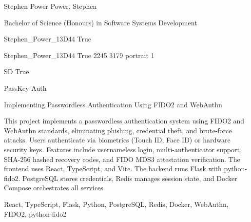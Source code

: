 
\begingroup{}\relax



\def\Key{Stephen_Power_13D44}

{Stephen Power}
{Power, Stephen}

{Bachelor of Science (Honours) in Software Systems Development}

{Stephen_Power_13D44}
{True}

{Stephen_Power_13D44}
{True}
{2245}
{3179}
{portrait}
{1}

{SD}
{True}

{PassKey Auth}

{Implementing Passwordless Authentication Using FIDO2 and WebAuthn}

{This project implements a passwordless authentication system using {FIDO2} and {WebAuthn} standards, eliminating phishing, credential theft, and brute-force attacks. Users authenticate via biometrics (Touch ID, Face ID) or hardware security keys. Features include usernameless login, multi-authenticator support, SHA-256 hashed recovery codes, and FIDO MDS3 attestation verification. The frontend uses React, TypeScript, and Vite. The backend runs Flask with python-fido2. PostgreSQL stores credentials, Redis manages session state, and Docker Compose orchestrates all services.}

{React, TypeScript, Flask, Python, PostgreSQL, Redis, Docker, WebAuthn, FIDO2, python-fido2}

